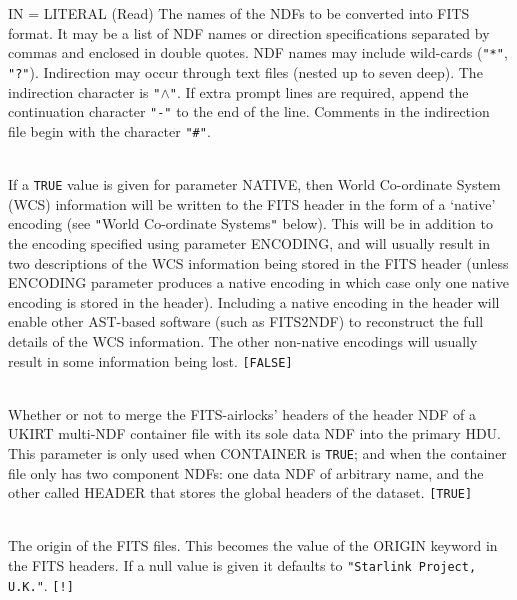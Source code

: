 \documentclass[twoside,11pt]{article}
\newcommand{\htmlref}[2]{#1}
\newcommand{\xref}[3]{#1}
\newcommand{\dqt}[1]{{\texttt{"#1"}}}
\newcommand{\hash}{\dqt{\#}}
\newcommand{\hash}{\dqt{#}}
\newcommand{\sstsubsection}[1]{ \item[{#1}] \mbox{} \\}
\newcommand{\sstsubsection}[1]{\item[{#1}]}
\begin{document}
{{{         IN = LITERAL (Read)
      }{
         The names of the NDFs to be converted into FITS format.  It
         may be a list of NDF names or direction specifications
         separated by commas and enclosed in double quotes.  
         NDF names may include wild-cards (\texttt{"*"}, \texttt{"?"}).
         Indirection may occur through text files (nested up to seven
         deep).  The indirection character is \texttt{"$\wedge$"}.  If extra
         prompt lines are required, append the continuation character
         \texttt{"-"} to the end of the line.
         Comments in the indirection file begin with the character \hash.
      }
      \sstsubsection{
         NATIVE = \_LOGICAL (Read)
      }{
         If a \texttt{TRUE} value is given for parameter NATIVE, then World
         Co-ordinate System (WCS) information will be written to the
         FITS header in the form of a `native' encoding (see 
         \htmlref{\texttt{"}World Co-ordinate Systems\texttt{"}}
         {world_coordinate_systems} below).  This will be in addition to the
         encoding specified using parameter ENCODING, and will usually result
         in  two descriptions of the WCS information being stored in the FITS 
         header (unless ENCODING parameter produces a native encoding in which
         case only one native encoding is stored in the header). Including a
         native encoding in the header will enable other 
         \xref{AST}{sun210}{abstract}-based software 
         (such as 
         \htmlref{FITS2NDF}{FITS2NDF}) 
         to reconstruct the full details of the WCS information. 
         The other non-native encodings will usually result in some 
         information being lost. \texttt{[FALSE]}
      }
      \sstsubsection{
         MERGE = \_LOGICAL (Read)
      }{
         Whether or not to merge the FITS-airlocks' headers of the 
         header NDF of a UKIRT multi-NDF container file with its sole 
         data NDF into the primary HDU.  This parameter is only used
         when CONTAINER is \texttt{TRUE}; and when the container file only has
         two component NDFs: one data NDF of arbitrary name, and the
         other called HEADER that stores the global headers of the
         dataset. \texttt{[TRUE]}
      }
      \sstsubsection{
         ORIGIN = LITERAL (Read)
      }{
         The origin of the FITS files.  This becomes the value of the
         ORIGIN keyword in the FITS headers.  If a null value is given
         it defaults to \texttt{"Starlink Project, U.K."}.
         \texttt{[!]}
      }
      \sstsubsection{
         OUT = LITERAL (Write)
}}}
\end{document}
